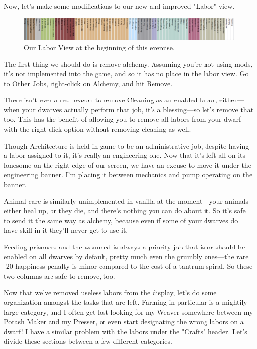 \documentclass[]{article}
\begin{document}
Now, let's make some modifications to our new and improved "Labor" view.

\begin{figure}[h!]
\centering \includegraphics[width=\linewidth]{Sec3Fig17}
\caption{Our Labor View at the beginning of this exercise.}
\end{figure}

The first thing we should do is remove alchemy. Assuming you're not using mods, it's not implemented into
the game, and so it has no place in the labor view. Go to Other Jobs, right-click on Alchemy, and hit
Remove.
\vspace{12pt}

There isn't ever a real reason to remove Cleaning as an enabled labor, either---when your dwarves
actually perform that job, it's a blessing---so let's remove that too. This has the benefit of allowing
you to remove all labors from your dwarf with the right click option without removing cleaning as well.
\vspace{12pt}

Though Architecture is held in-game to be an administrative job, despite having a labor assigned to it,
it's really an engineering one. Now that it's left all on its lonesome on the right edge of our screen,
we have an excuse to move it under the engineering banner. I'm placing it between mechanics and pump
operating on the banner.
\vspace{12pt}

Animal care is similarly unimplemented in vanilla at the moment---your animals either heal up, or they
die, and there's nothing you can do about it. So it's safe to send it the same way as alchemy, because
even if some of your dwarves do have skill in it they'll never get to use it.
\vspace{12pt}

Feeding prisoners and the wounded is always a priority job that is or should be enabled on all dwarves by
default, pretty much even the grumbly ones---the rare -20 happiness penalty is minor compared to the cost
of a tantrum spiral. So these two columns are safe to remove, too.
\vspace{12pt}

Now that we've removed useless labors from the display, let's do some organization amongst the tasks that
are left. Farming in particular is a mightily large category, and I often get lost looking for my Weaver
somewhere between my Potash Maker and my Presser, or even start designating the wrong labors on a dwarf!
I have a similar problem with the labors under the "Crafts" header. Let's divide these sections between a
few different categories.
\vspace{12pt}
\end{document}
